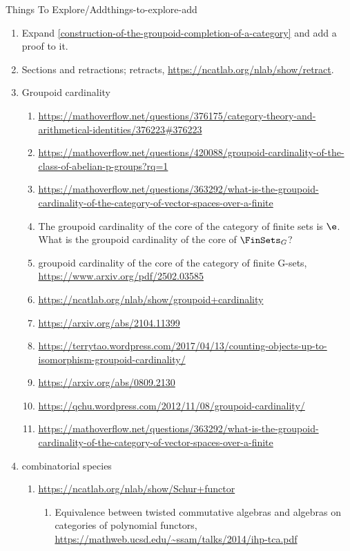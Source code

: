 \begin{remark}{Things To Explore/Add}{things-to-explore-add}
\begin{enumerate}
        \item Expand \cref{construction-of-the-groupoid-completion-of-a-category} and add a proof to it.
        \item Sections and retractions; retracts, \url{https://ncatlab.org/nlab/show/retract}.
        \item Groupoid cardinality
            \begin{enumerate}
                \item \url{https://mathoverflow.net/questions/376175/category-theory-and-arithmetical-identities/376223#376223}
                \item \url{https://mathoverflow.net/questions/420088/groupoid-cardinality-of-the-class-of-abelian-p-groups?rq=1}
                \item \url{https://mathoverflow.net/questions/363292/what-is-the-groupoid-cardinality-of-the-category-of-vector-spaces-over-a-finite}
                \item The groupoid cardinality of the core of the category of finite sets is $\e$. What is the groupoid cardinality of the core of $\FinSets_{G}$?
                \item groupoid cardinality of the core of the category of finite G-sets, \url{https://www.arxiv.org/pdf/2502.03585}
                \item \url{https://ncatlab.org/nlab/show/groupoid+cardinality}
                \item \url{https://arxiv.org/abs/2104.11399}
                \item \url{https://terrytao.wordpress.com/2017/04/13/counting-objects-up-to-isomorphism-groupoid-cardinality/}
                \item \url{https://arxiv.org/abs/0809.2130}
                \item \url{https://qchu.wordpress.com/2012/11/08/groupoid-cardinality/}
                \item \url{https://mathoverflow.net/questions/363292/what-is-the-groupoid-cardinality-of-the-category-of-vector-spaces-over-a-finite}
            \end{enumerate}
        \item combinatorial species
            \begin{enumerate}
                \item \url{https://ncatlab.org/nlab/show/Schur+functor}
                    \begin{enumerate}
                        \item Equivalence between twisted commutative algebras and algebras on categories of polynomial functors, \url{https://mathweb.ucsd.edu/~ssam/talks/2014/ihp-tca.pdf}

\end{enumerate}
\end{enumerate}
\end{enumerate}
\end{remark}
